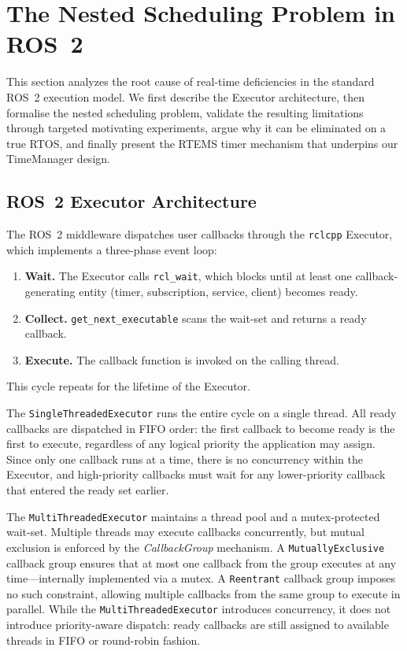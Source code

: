 \section{The Nested Scheduling Problem in ROS~2}

This section analyzes the root cause of real-time deficiencies in the standard ROS~2 execution model.
We first describe the Executor architecture, then formalise the nested scheduling problem, validate the resulting limitations through targeted motivating experiments, argue why it can be eliminated on a true RTOS, and finally present the RTEMS timer mechanism that underpins our TimeManager design.

\subsection{ROS~2 Executor Architecture}

The ROS~2 middleware dispatches user callbacks through the \texttt{rclcpp} Executor, which implements a three-phase event loop:
\begin{enumerate}
    \item \textbf{Wait.} The Executor calls \texttt{rcl\_wait}, which blocks until at least one callback-generating entity (timer, subscription, service, client) becomes ready.
    \item \textbf{Collect.} \texttt{get\_next\_executable} scans the wait-set and returns a ready callback.
    \item \textbf{Execute.} The callback function is invoked on the calling thread.
\end{enumerate}
This cycle repeats for the lifetime of the Executor.

The \texttt{SingleThreadedExecutor} runs the entire cycle on a single thread.
All ready callbacks are dispatched in FIFO order: the first callback to become ready is the first to execute, regardless of any logical priority the application may assign.
Since only one callback runs at a time, there is no concurrency within the Executor, and high-priority callbacks must wait for any lower-priority callback that entered the ready set earlier.

The \texttt{MultiThreadedExecutor} maintains a thread pool and a mutex-protected wait-set.
Multiple threads may execute callbacks concurrently, but mutual exclusion is enforced by the \emph{CallbackGroup} mechanism.
A \texttt{MutuallyExclusive} callback group ensures that at most one callback from the group executes at any time---internally implemented via a mutex.
A \texttt{Reentrant} callback group imposes no such constraint, allowing multiple callbacks from the same group to execute in parallel.
While the \texttt{MultiThreadedExecutor} introduces concurrency, it does not introduce priority-aware dispatch: ready callbacks are still assigned to available threads in FIFO or round-robin fashion.

